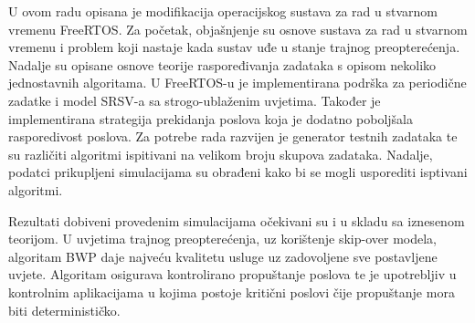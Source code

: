 \documentclass[../zavrsni.tex]{subfiles}
\begin{document}
\sloppy

\justifying

U ovom radu opisana je modifikacija operacijskog sustava za rad u stvarnom vremenu FreeRTOS. Za početak, objašnjenje su osnove sustava za 
rad u stvarnom vremenu i problem koji nastaje kada sustav uđe u stanje trajnog preopterećenja. Nadalje su opisane osnove teorije raspoređivanja 
zadataka s opisom nekoliko jednostavnih algoritama. 
U FreeRTOS-u je implementirana podrška za periodične zadatke i model SRSV-a sa strogo-ublaženim uvjetima.
Također je implementirana strategija prekidanja poslova koja je dodatno poboljšala rasporedivost poslova.
Za potrebe rada razvijen je generator testnih zadataka te su različiti algoritmi ispitivani na velikom broju skupova zadataka.
Nadalje, podatci prikupljeni simulacijama su obrađeni kako bi se mogli usporediti isptivani algoritmi.

Rezultati dobiveni provedenim simulacijama očekivani su i u skladu sa iznesenom teorijom. U uvjetima trajnog preopterećenja, uz korištenje skip-over modela,  
algoritam BWP daje najveću kvalitetu usluge uz zadovoljene sve postavljene uvjete. Algoritam osigurava kontrolirano propuštanje poslova te je upotrebljiv 
u kontrolnim aplikacijama u kojima postoje kritični poslovi čije propuštanje mora biti determinističko.
\end{document}

